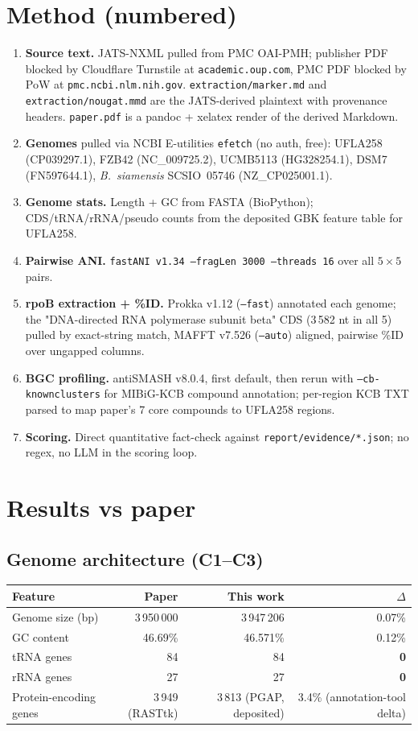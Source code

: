 \documentclass[11pt]{article}
\begin{document}
\section{Method (numbered)}
\begin{enumerate}
\item \textbf{Source text.} JATS-NXML pulled from PMC OAI-PMH; publisher PDF blocked by Cloudflare Turnstile at \texttt{academic.oup.com}, PMC PDF blocked by PoW at \texttt{pmc.ncbi.nlm.nih.gov}. \texttt{extraction/marker.md} and \texttt{extraction/nougat.mmd} are the JATS-derived plaintext with provenance headers. \texttt{paper.pdf} is a pandoc + xelatex render of the derived Markdown.
\item \textbf{Genomes} pulled via NCBI E-utilities \texttt{efetch} (no auth, free): UFLA258 (CP039297.1), FZB42 (NC\_009725.2), UCMB5113 (HG328254.1), DSM7 (FN597644.1), \textit{B.\ siamensis} SCSIO~05746 (NZ\_CP025001.1).
\item \textbf{Genome stats.} Length + GC from FASTA (BioPython); CDS/tRNA/rRNA/pseudo counts from the deposited GBK feature table for UFLA258.
\item \textbf{Pairwise ANI.} \texttt{fastANI v1.34 --fragLen 3000 --threads 16} over all $5{\times}5$ pairs.
\item \textbf{rpoB extraction + \%ID.} Prokka v1.12 (\texttt{--fast}) annotated each genome; the "DNA-directed RNA polymerase subunit beta" CDS (3\,582 nt in all 5) pulled by exact-string match, MAFFT v7.526 (\texttt{--auto}) aligned, pairwise \%ID over ungapped columns.
\item \textbf{BGC profiling.} antiSMASH v8.0.4, first default, then rerun with \texttt{--cb-knownclusters} for MIBiG-KCB compound annotation; per-region KCB TXT parsed to map paper's 7 core compounds to UFLA258 regions.
\item \textbf{Scoring.} Direct quantitative fact-check against \texttt{report/evidence/*.json}; no regex, no LLM in the scoring loop.
\end{enumerate}

\section{Results vs paper}

\subsection*{Genome architecture (C1--C3)}
\begin{tabularx}{\textwidth}{@{}Xrrr@{}}
\toprule
Feature & Paper & This work & $\Delta$ \\
\midrule
Genome size (bp) & 3\,950\,000 & 3\,947\,206 & 0.07\% \\
GC content & 46.69\% & 46.571\% & 0.12\% \\
tRNA genes & 84 & 84 & \textbf{0} \\
rRNA genes & 27 & 27 & \textbf{0} \\
Protein-encoding genes & 3\,949 (RASTtk) & 3\,813 (PGAP, deposited) & 3.4\% (annotation-tool delta) \\
\bottomrule
\end{tabularx}
\end{document}
